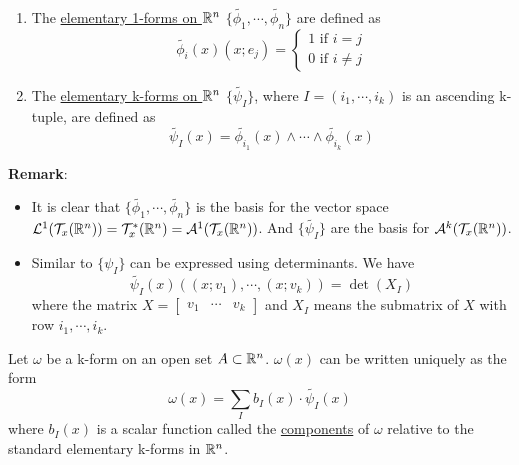 \begin{definition}\
    \begin{enumerate}
        \item The \underline{elementary 1-forms on $\mathbb{R}^n$} $\{\tilde{\phi_1},\cdots,\tilde{\phi_n}\}$ are defined as
        \begin{equation*}
            \tilde{\phi_i}(x)(x;e_j)=\begin{cases}
                1 \text{ if }i=j\\
                0 \text{ if }i\neq j
            \end{cases}
        \end{equation*}
        \item The \underline{elementary k-forms on $\mathbb{R}^n$} $\{\tilde{\psi_I}\}$, where $I=(i_1,\cdots,i_k)$ is an ascending k-tuple, are defined as 
        \begin{equation*}
            \tilde{\psi_I}(x)= \tilde{\phi_{i_1}}(x)\wedge \cdots \wedge \tilde{\phi_{i_k}}(x)
        \end{equation*}
    \end{enumerate}
\end{definition}

\noindent\textbf{Remark}:
\begin{itemize}
    \item It is clear that $\{\tilde{\phi_1},\cdots,\tilde{\phi_n}\}$ is the basis for the vector space $\mathcal{L}^1(\mathcal{T}_x(\mathbb{R}^n))=\mathcal{T}^*_x(\mathbb{R}^n)=\mathcal{A}^1(\mathcal{T}_x(\mathbb{R}^n))$. 
    And $\{\tilde{\psi_I}\}$ are the basis for $\mathcal{A}^k(\mathcal{T}_x(\mathbb{R}^n))$.
    \item Similar to $\{\psi_I\}$ can be expressed using determinants. We have 
    $$\tilde{\psi_I}(x)((x;v_1),\cdots,(x;v_k))=\det(X_I)$$
    where the matrix $X=\begin{bmatrix}
        v_1 & \cdots & v_k
    \end{bmatrix}$ and $X_I$ means the submatrix of $X$ with row $i_1,\cdots,i_k$.
\end{itemize}

\begin{theorem}
    Let $\omega$ be a k-form on an open set $A\subset \mathbb{R}^n$. $\omega(x)$ can be written uniquely as the form
    $$\omega(x)=\sum_Ib_I(x)\cdot \tilde{\psi_I}(x)$$
    where $b_I(x)$ is a scalar function called the \underline{components} of $\omega$ relative to the standard elementary k-forms in $\mathbb{R}^n$.
\end{theorem}

